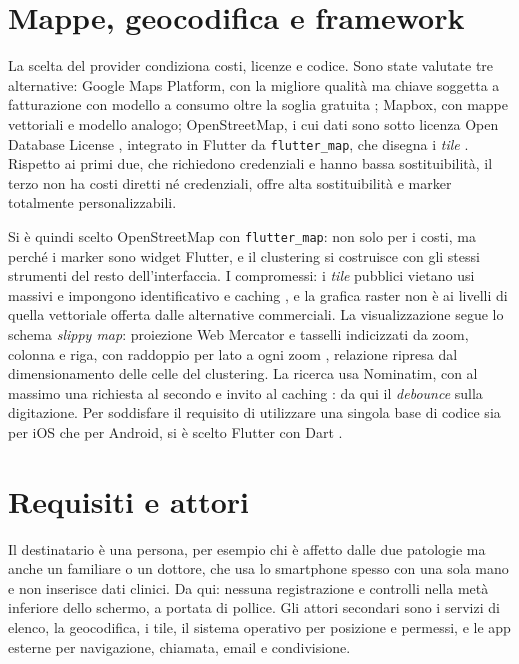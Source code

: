 \documentclass[a4paper, oneside, openright]{book}
\begin{document}
\section{Mappe, geocodifica e framework}\label{sec:sintesi-mappe}

La scelta del provider condiziona costi, licenze e codice.
Sono state valutate tre alternative: Google Maps Platform, con la migliore qualit\`a
ma chiave soggetta a fatturazione con modello a consumo oltre la soglia
gratuita \cite{googleMapsPricing}; Mapbox, con mappe vettoriali e modello
analogo; OpenStreetMap, i cui dati sono sotto licenza Open Database License
\cite{osmCopyright}, integrato in Flutter da
\texttt{flutter\_map}, che disegna i \textit{tile} \cite{flutterMapPkg}.
Rispetto ai primi due, che richiedono credenziali e hanno bassa
sostituibilit\`a, il terzo non ha costi diretti n\'e credenziali, offre alta
sostituibilit\`a e marker totalmente personalizzabili.

Si è quindi scelto OpenStreetMap con \texttt{flutter\_map}: non solo
per i costi, ma perch\'e i marker sono widget Flutter, e il clustering si
costruisce con gli stessi strumenti del resto dell'interfaccia.
I compromessi: i \textit{tile} pubblici vietano usi massivi e impongono
identificativo e caching \cite{osmTilePolicy}, e la grafica raster non \`e
ai livelli di quella vettoriale offerta dalle alternative commerciali.
La visualizzazione segue lo schema \emph{slippy map}: proiezione Web
Mercator e tasselli indicizzati da zoom, colonna e riga, con raddoppio per
lato a ogni zoom \cite{slippyMap}, relazione ripresa dal dimensionamento
delle celle del clustering.
La ricerca usa Nominatim, con al massimo una richiesta al secondo e invito
al caching \cite{nominatimPolicy}: da qui il \textit{debounce} sulla
digitazione.
Per soddisfare il requisito di utilizzare una singola base di codice sia per iOS che per Android, si è scelto Flutter con Dart
\cite{flutterDocs}.%

\section{Requisiti e attori}\label{sec:sintesi-requisiti}

Il destinatario \`e una persona, per esempio chi \`e affetto dalle due
patologie ma anche un familiare o un dottore, che usa lo smartphone spesso
con una sola mano e non inserisce dati clinici.
Da qui: nessuna registrazione e controlli nella met\`a inferiore dello
schermo, a portata di pollice.
Gli attori secondari sono i servizi di elenco, la geocodifica, i tile, il
sistema operativo per posizione e permessi, e le app esterne per
navigazione, chiamata, email e condivisione.
\end{document}

